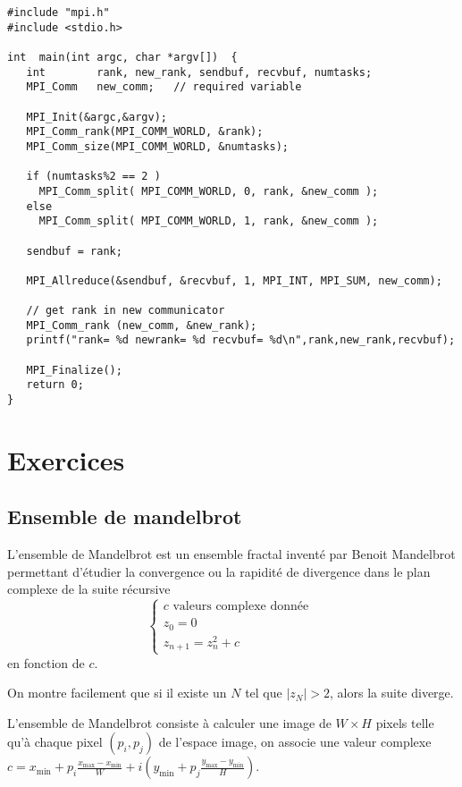 \documentclass[11pt,a4paper]{article}
\begin{document}
\begin{lstlisting}
#include "mpi.h"
#include <stdio.h>

int  main(int argc, char *argv[])  {
   int        rank, new_rank, sendbuf, recvbuf, numtasks;
   MPI_Comm   new_comm;   // required variable

   MPI_Init(&argc,&argv);
   MPI_Comm_rank(MPI_COMM_WORLD, &rank);
   MPI_Comm_size(MPI_COMM_WORLD, &numtasks);

   if (numtasks%2 == 2 )
     MPI_Comm_split( MPI_COMM_WORLD, 0, rank, &new_comm );
   else
     MPI_Comm_split( MPI_COMM_WORLD, 1, rank, &new_comm );

   sendbuf = rank;

   MPI_Allreduce(&sendbuf, &recvbuf, 1, MPI_INT, MPI_SUM, new_comm);

   // get rank in new communicator
   MPI_Comm_rank (new_comm, &new_rank);
   printf("rank= %d newrank= %d recvbuf= %d\n",rank,new_rank,recvbuf);

   MPI_Finalize();
   return 0;
}
\end{lstlisting}

\section{Exercices}

\subsection{Ensemble de mandelbrot}

L'ensemble de Mandelbrot est un ensemble fractal inventé par Benoit Mandelbrot permettant d'étudier  la convergence ou la rapidité de divergence dans le plan complexe de la suite récursive 
$$
\left\{\begin{array}{l}
c \mbox{ valeurs complexe donnée } \\
z_{0} = 0\\
z_{n+1} = z_{n}^{2} + c
\end{array}\right.
$$
en fonction de $c$.

On montre facilement que si il existe un $N$ tel que $|z_{N}| > 2$, alors la suite diverge. 

L'ensemble de Mandelbrot consiste à calculer une image de $W \times H$ pixels telle qu'à chaque pixel $\left(p_{i},p_{j}\right)$ de l'espace image, on associe une valeur complexe
$c = x_{\min}+p_{i} \frac{x_{\max}-x_{\min}}{W} +  i \left (y_{\min}+p_{j} \frac{y_{\max}-y_{\min}}{H}\right)$.
\end{document}
